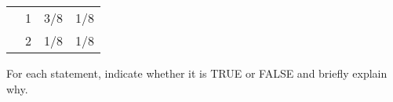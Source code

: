 \documentclass[addpoints,12pt]{exam}
\begin{document}
\begin{questions}
\begin{parts}
\begin{solution}[7cm]
\begin{center}
\begin{tabular}{|cc|cc|}
&1& \multicolumn{1}{|c}{3/8} & 1/8\\
&2& \multicolumn{1}{|c}{1/8} & 1/8\\
\hline
\end{tabular}
\end{center}
 		\end{solution}
 	\end{parts}



\question For each statement, indicate whether it is TRUE or FALSE and briefly explain why.
\begin{parts}

\end{parts}
\end{questions}
\end{document}
